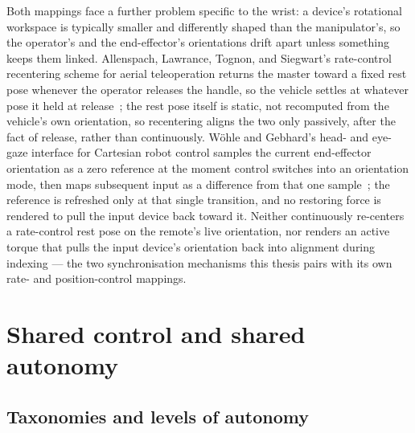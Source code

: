 Both mappings face a further problem specific to the wrist: a device's rotational workspace is typically smaller and differently shaped than the manipulator's, so the operator's and the end-effector's orientations drift apart unless something keeps them linked. Allenspach, Lawrance, Tognon, and Siegwart's rate-control recentering scheme for aerial teleoperation returns the master toward a fixed rest pose whenever the operator releases the handle, so the vehicle settles at whatever pose it held at release~\cite{allenspach2022bilateral}; the rest pose itself is static, not recomputed from the vehicle's own orientation, so recentering aligns the two only passively, after the fact of release, rather than continuously. W\"ohle and Gebhard's head- and eye-gaze interface for Cartesian robot control samples the current end-effector orientation as a zero reference at the moment control switches into an orientation mode, then maps subsequent input as a difference from that one sample~\cite{wohle2021gaze}; the reference is refreshed only at that single transition, and no restoring force is rendered to pull the input device back toward it. Neither continuously re-centers a rate-control rest pose on the remote's live orientation, nor renders an active torque that pulls the input device's orientation back into alignment during indexing --- the two synchronisation mechanisms this thesis pairs with its own rate- and position-control mappings.

\section{Shared control and shared autonomy}
\label{sec:sota-shared-control}

\subsection{Taxonomies and levels of autonomy}
\label{sec:sota-taxonomies}

